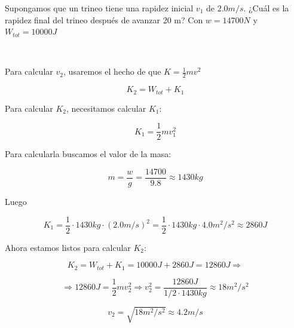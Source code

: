 \documentclass{article}
\newcommand{\newex}[1]{
    \vspace{0.5cm}
    \noindent{\large \color{exerciceColor} \textbf{#1}}\\[0.2cm]
}
\begin{document}
    \par Supongamos que un trineo tiene una rapidez inicial $v_1$ de $2.0 m/s$. ¿Cuál es la rapidez final del trineo después de avanzar 20 m? Con $w = 14700 N$ y $W_{tot} = 10000J$

    \newex{Solución 9.}

    \par Para calcular $v_2$, usaremos el hecho de que $K = \frac{1}{2}m v^2$

    \[ K_2 = W_{tot} + K_1 \]

    \par Para calcular $K_2$, necesitamos calcular $K_1$:

    \[ K_1 = \frac{1}{2} m v_1^2 \]

    \par Para calcularla buscamos el valor de la masa:

    \[ m = \frac{w}{g} = \frac{14700}{9.8} \approx 1430 kg \]

    \par Luego

    \[ K_1 = \frac{1}{2} \cdot 1430 kg \cdot (2.0 m/s)^2 = \frac{1}{2} \cdot 1430 kg \cdot 4.0 m^2/s^2 \approx 2860 J \]

    \par Ahora estamos listos para calcular $K_2$:

    \[ K_2 = W_{tot} + K_1 = 10000 J + 2860 J = 12860 J \Longrightarrow  \]

    \[ \Longrightarrow 12860 J = \frac{1}{2}m v_2^2 \Longrightarrow v_2^2 = \frac{12860 J}{1/2 \cdot 1430 kg} \approx 18 m^2/s^2 \]

    \[ v_2 = \sqrt{18 m^2/s^2} \approx 4.2 m/s \]
\end{document}
